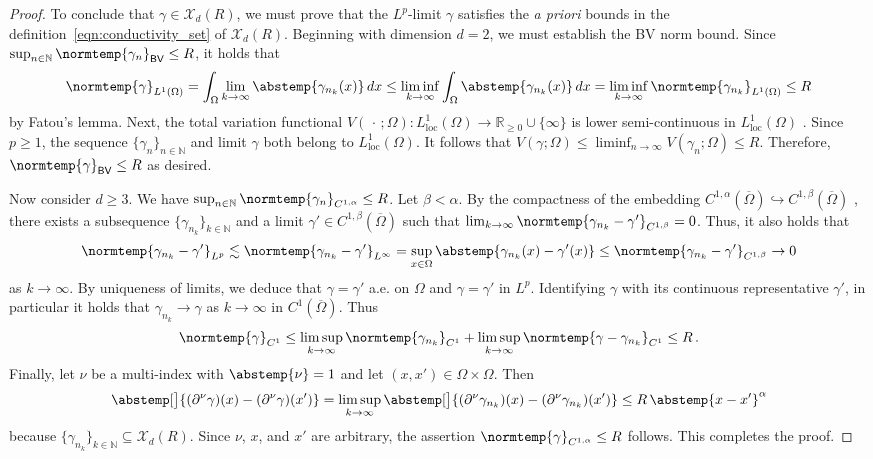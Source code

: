 \documentclass[pdflatex,sn-mathphys-num]{sn-jnl-preprint}
\newcommand{\N}{\mathbb{N}}
\newcommand{\R}{\mathbb{R}}
\newcommand{\cX}{\mathcal{X}}
\newcommand{\BV}{\mathsf{BV}}
\newcommand{\norm}{\normtemp}
\newcommand{\abs}{\abstemp}
\newcommand{\diff}{d}
\newcommand{\dd}[1]{\,\diff{#1}}
\newcommand{\al}{\alpha}
\newcommand{\slot}{{\,\cdot\,}}
\theoremstyle{thmstyleone}%
\theoremstyle{thmstyletwo}%
\theoremstyle{thmstylethree}%
\numberwithin{equation}{section}
\numberwithin{theorem}{section}
\begin{document}
\begin{proof}
    To conclude that $\gamma\in\cX_d(R)$, we must prove that the $L^p$-limit $\gamma$ satisfies the \emph{a priori} bounds in the definition~\eqref{eqn:conductivity_set} of $\cX_d(R)$. Beginning with dimension $d=2$, we must establish the BV norm bound. Since $\sup_{n\in\N}\norm{\gamma_n}_{\BV}\leq R$, it holds that
    \begin{align*}
        \norm{\gamma}_{L^1(\Omega)}=\int_\Omega\lim_{k\to\infty}\abs{\gamma_{n_k}(x)}\dd{x}
        \leq \liminf_{k\to\infty}\int_\Omega\abs{\gamma_{n_k}(x)}\dd{x}
        = \liminf_{k\to\infty}\norm{\gamma_{n_k}}_{L^1(\Omega)}\leq R
    \end{align*}
    by Fatou's lemma. Next, the total variation functional $V(\slot;\Omega)\colon L^1_{\mathrm{loc}}(\Omega)\to\R_{\geq 0}\cup\{\infty\}$ is lower semi-continuous in $L^1_{\mathrm{loc}}(\Omega)$ \cite[Exercise~14.3~(iii), p.~460]{leoni2017first}. Since $p\geq 1$, the sequence $\{\gamma_n\}_{n\in\N}$ and limit $\gamma$ both belong to $L^1_{\mathrm{loc}}(\Omega)$. It follows that $V(\gamma;\Omega)\leq \liminf_{n\to\infty} V(\gamma_n;\Omega)\leq R$. Therefore, $\norm{\gamma}_{\BV}\leq R$ as desired.

    Now consider $d\geq 3$. We have $\sup_{n\in\N}\norm{\gamma_n}_{C^{1,\al}}\leq R$. Let $\beta<\al$. By the compactness of the embedding $C^{1,\al}(\overline{\Omega})\hookrightarrow C^{1,\beta}(\overline{\Omega})$ \cite[Thm.~1.34, pp.~11--12]{adams2003sobolev}, there exists a subsequence $\{\gamma_{n_k}\}_{k\in\N}$ and a limit $\gamma'\in C^{1,\beta}(\overline{\Omega})$ such that $\lim_{k\to\infty}\norm{\gamma_{n_k}-\gamma'}_{C^{1,\beta}}=0$. Thus, it also holds that
    \begin{align*}
        \norm{\gamma_{n_k}-\gamma'}_{L^p}\lesssim \norm{\gamma_{n_k}-\gamma'}_{L^\infty}=\sup_{x\in\Omega}\abs{\gamma_{n_k}(x)-\gamma'(x)}\leq \norm{\gamma_{n_k}-\gamma'}_{C^{1,\beta}}\to 0
    \end{align*}
    as $k\to\infty$. By uniqueness of limits, we deduce that $\gamma=\gamma'$ a.e. on $\Omega$ and $\gamma=\gamma'$ in $L^p$. Identifying $\gamma$ with its continuous representative $\gamma'$, in particular it holds that $\gamma_{n_k}\to\gamma$ as $k\to\infty$ in $C^1(\overline{\Omega})$. Thus
    \begin{align*}
        \norm{\gamma}_{C^1}\leq \limsup_{k\to\infty}\norm{\gamma_{n_k}}_{C^1} + \limsup_{k\to\infty}\norm{\gamma - \gamma_{n_k}}_{C^1}\leq R\,.
    \end{align*}
    Finally, let $\nu$ be a multi-index with $\abs{\nu}=1$ and let $(x,x')\in\Omega\times\Omega$. Then
    \begin{align*}
        \abs[\big]{(\partial^\nu\gamma)(x)-(\partial^\nu\gamma)(x')}=\limsup_{k\to\infty}\abs[\big]{(\partial^\nu\gamma_{n_k})(x)-(\partial^\nu\gamma_{n_k})(x')}\leq R\, \abs{x-x'}^\al
    \end{align*}
    because $\{\gamma_{n_k}\}_{k\in\N}\subseteq \cX_d(R)$. Since $\nu$, $x$, and $x'$ are arbitrary, the assertion $\norm{\gamma}_{C^{1,\al}}\leq R $ follows. This completes the proof.
\end{proof}
\end{document}
